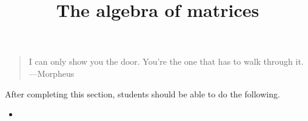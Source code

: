\documentclass{ximera}
\title{The algebra of matrices}
\begin{document}
\begin{abstract}
\end{abstract}
\maketitle

\begin{quote}
  I can only show you the door. You're the one that has to walk through it.
  \hfill ---Morpheus
\end{quote}
After completing this section, students should be able to do the following.

\begin{itemize}
\item 
\end{itemize}
\end{document}
